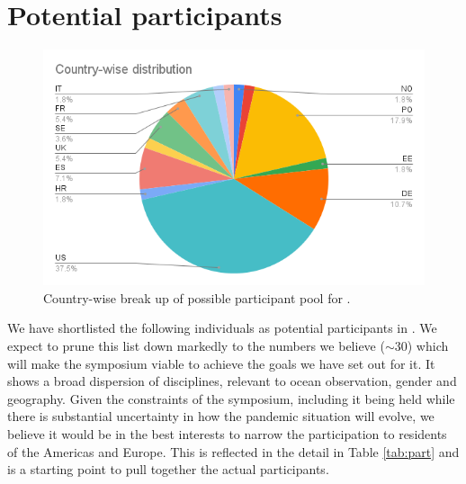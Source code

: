 \section{Potential participants}
\label{sec:part}

\begin{figure}
  \vspace{-0.5cm}
  \centering 
  \includegraphics[scale=0.4]{fig/country.png}
  \caption{Country-wise break up of possible participant pool for \sympe.}
  \label{fig:country}
\end{figure}

We have shortlisted the following individuals as potential
participants in \sympe. We expect to prune this list down markedly to
the numbers we believe ($\sim 30$) which will make the symposium
viable to achieve the goals we have set out for it. It shows a broad
dispersion of disciplines, relevant to ocean observation, gender and
geography. Given the constraints of the symposium, including it being
held while there is substantial uncertainty in how the pandemic
situation will evolve, we believe it would be in the best interests to
narrow the participation to residents of the Americas and Europe. This
is reflected in the detail in Table \ref{tab:part} and is a starting
point to pull together the actual participants.


